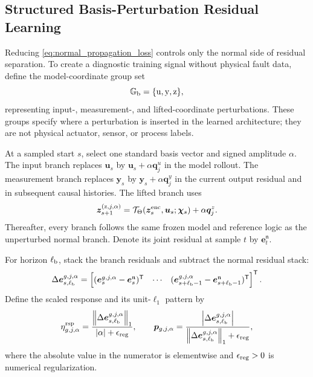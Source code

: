 \documentclass[journal]{IEEEtran}
\newcommand{\norm}[1]{\left\lVert #1\right\rVert}
\newcommand{\abs}[1]{\left\lvert #1\right\rvert}
\newcommand{\T}{\mathsf T}
\newcommand{\1}{\bm 1}
\begin{document}
\subsection{Structured Basis-Perturbation Residual Learning}
Reducing \eqref{eq:normal_propagation_loss} controls only the normal side of
residual separation. To create a diagnostic training signal without physical
fault data, define the model-coordinate group set
\begin{equation}
\mathbb G_{\rm b}=\{\mathrm u,\mathrm y,\mathrm z\},
\label{eq:group_set}
\end{equation}
representing input-, measurement-, and lifted-coordinate perturbations. These
groups specify where a perturbation is inserted in the learned architecture;
they are not physical actuator, sensor, or process labels.

At a sampled start $s$, select one standard basis vector and signed amplitude
$\alpha$. The input branch replaces $\bm u_s$ by
$\bm u_s+\alpha\bm q_j^u$ in the model rollout. The measurement branch
replaces $\bm y_s$ by $\bm y_s+\alpha\bm q_j^y$ in the current output residual
and in subsequent causal histories. The lifted branch uses
\begin{equation}
\bm z_{s+1}^{(\mathrm z,j,\alpha)}
=\mathcal T_\Theta(\bm z_s^{\rm enc},\bm u_s;\bm\chi_s)
+\alpha\bm q_j^z.
\label{eq:lifted_perturbation}
\end{equation}
Thereafter, every branch follows the same frozen model and reference logic as
the unperturbed normal branch. Denote its joint residual at sample $t$ by
$\bm e_t^{\mathfrak n}$.

For horizon $\ell_{\rm b}$, stack the branch residuals and subtract the
normal residual stack:
\begin{equation}
\Delta\bm e_{s,\ell_{\rm b}}^{g,j,\alpha}
=
\begin{bmatrix}
(\bm e_s^{g,j,\alpha}-\bm e_s^{\mathfrak n})^\T&
\cdots&
(\bm e_{s+\ell_{\rm b}-1}^{g,j,\alpha}
-\bm e_{s+\ell_{\rm b}-1}^{\mathfrak n})^\T
\end{bmatrix}^{\T}.
\label{eq:response_increment}
\end{equation}
Define the scaled response and its unit-$\ell_1$ pattern by
\begin{equation}
\eta_{g,j,\alpha}^{\rm rsp}=
\frac{\norm{\Delta\bm e_{s,\ell_{\rm b}}^{g,j,\alpha}}_1}
{\abs{\alpha}+\epsilon_{\rm reg}},
\qquad
\bm p_{g,j,\alpha}=
\frac{\abs{\Delta\bm e_{s,\ell_{\rm b}}^{g,j,\alpha}}}
{\norm{\Delta\bm e_{s,\ell_{\rm b}}^{g,j,\alpha}}_1+\epsilon_{\rm reg}},
\label{eq:response_pattern}
\end{equation}
where the absolute value in the numerator is elementwise and
$\epsilon_{\rm reg}>0$ is numerical regularization.
\end{document}
